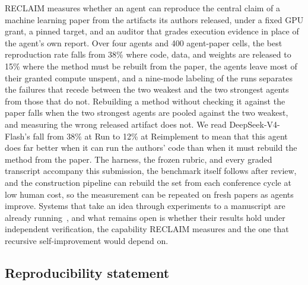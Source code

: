 \documentclass{article} %
\begin{document}
RECLAIM measures whether an agent can reproduce the central claim of a
machine learning paper from the artifacts its authors released, under a
fixed GPU grant, a pinned target, and an auditor that grades execution
evidence in place of the agent's own report. Over four agents and 400
agent-paper cells, the best reproduction rate falls from 38\% where code, data, and
weights are released to 15\% where the method must be rebuilt from the paper,
the agents leave most of their granted compute unspent, and a nine-mode
labeling of the runs separates the failures that recede between the two
weakest and the two strongest agents from those that do not. Rebuilding a
method without checking it against the paper falls when the two strongest
agents are pooled against the two weakest, and measuring the wrong released
artifact does not. We read DeepSeek-V4-Flash's fall from 38\% at Run to 12\% at
Reimplement to mean that this agent does far better when it can
run the authors' code than when it must rebuild the method from the paper. The harness, the frozen rubric, and every graded
transcript accompany this submission, the benchmark itself follows after
review, and the construction pipeline can rebuild the set from each conference cycle at low human cost, so the
measurement can be repeated on fresh papers as agents improve. Systems that take an
idea through experiments to a manuscript are already
running~\citep{lu2024aiscientist,schmidgall2025agentlab,tang2025airesearcher}, and what
remains open is whether their results hold under independent verification, the capability
RECLAIM measures and the one that recursive self-improvement would depend on.

\subsection*{Reproducibility statement}
\end{document}

